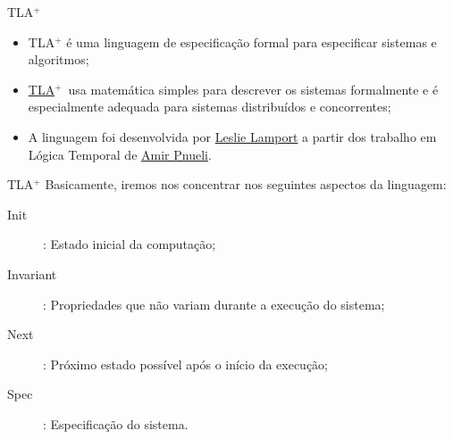 \def\comment#1{{\hfil\scriptsize\color{gray}(* #1 *)}}
\def\tla{TLA$^+$}


\frame{\title{\insertlecture}\maketitle}

\begin{frame}{\tla}
  \begin{itemize}
  \item<1,4> \alert{\tla} é uma linguagem de especificação formal para especificar sistemas
    e algoritmos;
  \item<2,4> \href{https://lamport.azurewebsites.net/tla/tla.html}{\tla}~usa matemática simples para descrever os sistemas formalmente e é
    especialmente adequada para sistemas distribuídos e concorrentes;
  \item<3,4> A linguagem foi desenvolvida por
    \href{http://www.lamport.org/}{Leslie Lamport} a partir dos
    trabalho em Lógica Temporal de
    \href{https://cs.nyu.edu/faculty/pnueli/}{Amir Pnueli}.
  \end{itemize}
\end{frame}

\begin{frame}{\tla}{}
  Basicamente, iremos nos concentrar nos seguintes aspectos da linguagem:

  \begin{description}
  \item[Init]: Estado inicial da computação;
  \item[Invariant]: Propriedades que não variam durante a execução do sistema;
  \item[Next]: Próximo estado possível após o início da execução;
  \item[Spec]: Especificação do sistema.
  \end{description}
  
  
\end{frame}

